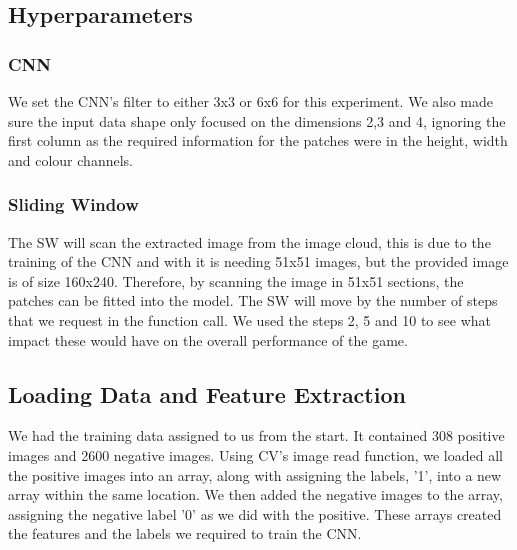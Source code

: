 \documentclass[a4paper,10pt]{article}
\begin{document}
\subsection{Hyperparameters}

\subsubsection{CNN}
We set the CNN's filter to either 3x3 or 6x6 for this experiment. We also made sure the input data shape only focused on the dimensions 2,3 and 4, ignoring the first column as the required information for the patches were in the height, width and colour channels.

\subsubsection{Sliding Window}
The SW will scan the extracted image from the image cloud, this is due to the training of the CNN and with it is needing 51x51 images, but the provided image is of size 160x240. Therefore, by scanning the image in 51x51 sections, the patches can be fitted into the model. The SW will move by the number of steps that we request in the function call. We used the steps 2, 5 and 10 to see what impact these would have on the overall performance of the game. 

\subsection{Loading Data and Feature Extraction}
We had the training data assigned to us from the start. It contained 308 positive images and 2600 negative images. Using CV's image read function, we loaded all the positive images into an array, along with assigning the labels, '1', into a new array within the same location. We then added the negative images to the array, assigning the negative label '0' as we did with the positive. These arrays created the features and the labels we required to train the CNN.
\end{document}
